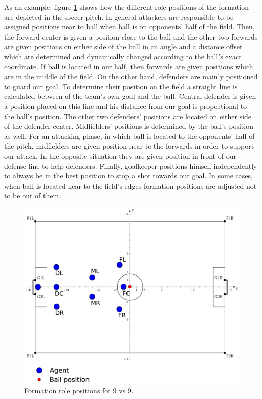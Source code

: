 As an example, figure \ref{fig:Formation9_0} shows how the different role positions of the formation are depicted in the soccer pitch. In general attackers are responsible to be assigned positions near to ball when ball is on opponents' half of the field. Then, the forward center  is given a position close to the ball and the other two forwards are given positions on either side of the ball in an angle and a distance offset which are determined and dynamically changed according to the ball's exact coordinate. If ball is located in our half, then forwards are given positions which are in the middle of the field. On the other hand, defenders are mainly positioned to guard our goal. To determine their position on the field a straight line is calculated between of the team's own goal and the ball. Central defender is given a position placed on this line and his distance from our goal is proportional to the ball's position. The other two defenders' positions are located on either side of the defender center. Midfielders' positions is determined by the ball's position as well. For an attacking phase, in which ball is located to the opponents' half of the pitch, midfielders are given position near to the forwards in order to support our attack. In the opposite situation they are given position in front of our defense line to help defenders. Finally, goalkeeper positions himself independently to always be in the best position to stop a shot towards our goal. In some cases, when ball is located near to the field's edges formation positions are adjusted not to be out of them.
\begin{figure}[htb!]
\centering
  \includegraphics[width=\textwidth]{Chapter4/figures/Formation9_0.pdf}
  \caption{Formation role positions for 9 vs 9.} 
  \label{fig:Formation9_0}
\end{figure}

